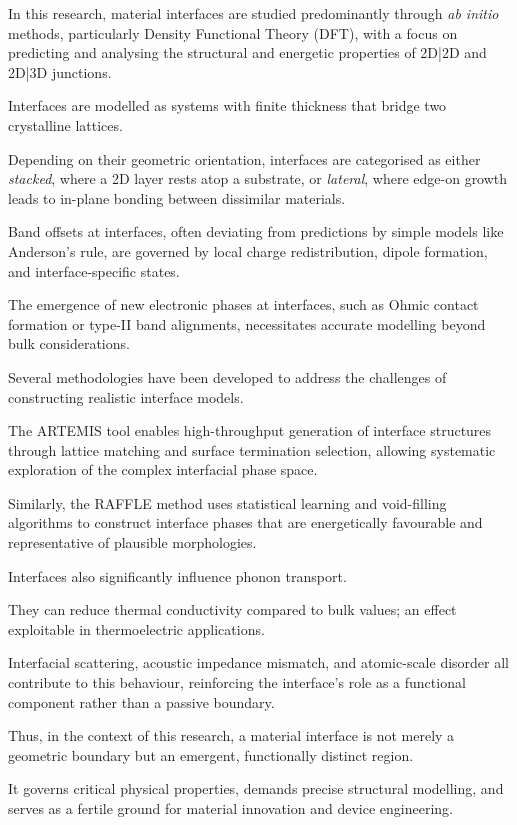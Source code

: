 In this research, material interfaces are studied predominantly through \textit{ab initio} methods, particularly Density
Functional Theory (DFT), with a focus on predicting and analysing the structural and energetic properties of 2D|2D and
2D|3D junctions.

Interfaces are modelled as systems with finite thickness that bridge two crystalline lattices.

Depending on their geometric orientation, interfaces are categorised as either \emph{stacked}, where a 2D layer rests
atop a substrate, or \emph{lateral}, where edge-on growth leads to in-plane bonding between dissimilar materials.

Band offsets at interfaces, often deviating from predictions by simple models like Anderson's rule, are governed by
local charge redistribution, dipole formation, and interface-specific states.

The emergence of new electronic phases at interfaces, such as Ohmic contact formation or type-II band alignments,
necessitates accurate modelling beyond bulk considerations.

Several methodologies have been developed to address the challenges of constructing realistic interface models.

The ARTEMIS tool enables high-throughput generation of interface structures through lattice matching and surface
termination selection, allowing systematic exploration of the complex interfacial phase space.

Similarly, the RAFFLE method uses statistical learning and void-filling algorithms to construct interface phases that
are energetically favourable and representative of plausible morphologies.

Interfaces also significantly influence phonon transport.

They can reduce thermal conductivity compared to bulk values; an effect exploitable in thermoelectric applications.

Interfacial scattering, acoustic impedance mismatch, and atomic-scale disorder all contribute to this behaviour,
reinforcing the interface's role as a functional component rather than a passive boundary.

Thus, in the context of this research, a material interface is not merely a geometric boundary but an emergent,
functionally distinct region.

It governs critical physical properties, demands precise structural modelling, and serves as a fertile ground for
material innovation and device engineering.

